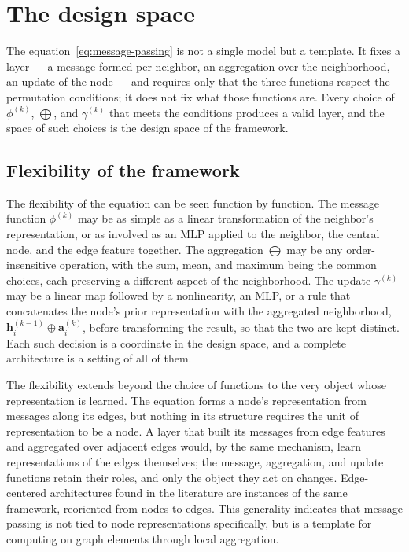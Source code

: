 \section{The design space}
\label{sec:design-space}
 
The equation~\eqref{eq:message-passing} is not a single model but a
template. It fixes a layer --- a message formed per neighbor, an
aggregation over the neighborhood, an update of the node --- and requires only
that the three functions respect the permutation conditions; it does not fix
what those functions are. Every choice of $\phi^{(k)}$, $\bigoplus$, and
$\gamma^{(k)}$ that meets the conditions produces a valid layer, and the space
of such choices is the design space of the framework. 
 
\subsection{Flexibility of the framework}
\label{sec:framework-flexibility}
 
The flexibility of the equation can be seen function by function. The message
function $\phi^{(k)}$ may be as simple as a linear transformation of the
neighbor's representation, or as involved as an MLP applied to
the neighbor, the central node, and the edge feature together.
The aggregation $\bigoplus$ may be any order-insensitive operation, with the sum,
mean, and maximum being the common choices, each preserving a different
aspect of the neighborhood. The update $\gamma^{(k)}$ may be a linear map
followed by a nonlinearity, an MLP, or a rule that
concatenates the node's prior representation with the aggregated neighborhood,
$\mathbf{h}_i^{(k-1)} \oplus \mathbf{a}_i^{(k)}$, before transforming the
result, so that the two are kept distinct. Each such decision
is a coordinate in the design space, and a complete architecture is a setting of
all of them.
 
The flexibility extends beyond the choice of functions to the very object whose
representation is learned. The equation forms a node's representation from
messages along its edges, but nothing in its structure requires the
unit of representation to be a node. A layer that built its messages from edge
features and aggregated over adjacent edges would, by the same mechanism, learn
representations of the edges themselves; the message, aggregation, and update
functions retain their roles, and only the object they act on changes. 
Edge-centered architectures found in the literature are instances of the
same framework, reoriented from nodes to edges. This generality indicates that
message passing is not tied to node representations specifically, but is a
template for computing on graph elements through local aggregation.
 

